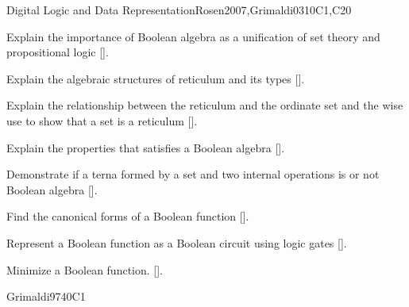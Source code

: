 \begin{syllabus}
\begin{unit}{Digital Logic and Data Representation}{}{Rosen2007,Grimaldi03}{10}{C1,C20}
    \begin{learningoutcomes}
     \item Explain the importance of Boolean algebra as a unification of set theory and propositional logic [\Assessment].
     \item Explain the algebraic structures of reticulum and its types [\Assessment].
     \item Explain the relationship between the reticulum and the ordinate set and the wise use to show that a set is a reticulum [\Assessment].
     \item Explain the properties that satisfies a Boolean algebra [\Assessment].
     \item Demonstrate if a terna formed by a set and two internal operations is or not Boolean algebra [\Assessment].
     \item Find the canonical forms of a Boolean function  [\Assessment].
     \item Represent a Boolean function as a Boolean circuit using logic gates  [\Assessment].
     \item Minimize a Boolean function. [\Assessment].
     \end{learningoutcomes}
  \end{unit}

\begin{unit}{\DSBasicsofCounting}{}{Grimaldi97}{40}{C1} 
    \begin{topics}
        \item \DSBasicsofCountingTopicCounting
        \item \DSBasicsofCountingTopicThePigeonhole
        \item \DSBasicsofCountingTopicPermutations
        \item \DSBasicsofCountingTopicSolving
        \item \DSBasicsofCountingTopicBasic
   \end{topics}
   \begin{learningoutcomes}
        \item \DSBasicsofCountingLOApplyCounting [\Familiarity]
        \item \DSBasicsofCountingLOApplyThe[\Familiarity]
        \item \DSBasicsofCountingLOComputePermutations[\Familiarity]
        \item \DSBasicsofCountingLOMap[\Familiarity]
        \item \DSBasicsofCountingLOSolveA[\Familiarity]
        \item \DSBasicsofCountingLOAnalyzeA[\Familiarity]
        \item \DSBasicsofCountingLOPerformComputations[\Familiarity]
   \end{learningoutcomes}
\end{unit}


\end{syllabus}
